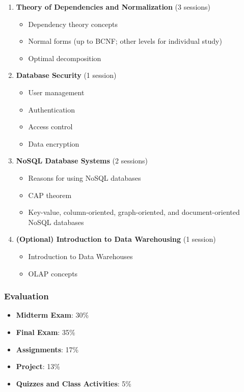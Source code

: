 \documentclass[12pt]{article}
\begin{document}
\begin{enumerate}
    \item \textbf{Theory of Dependencies and Normalization} (3 sessions)
        \begin{itemize}
            \item Dependency theory concepts
            \item Normal forms (up to BCNF; other levels for individual study)
            \item Optimal decomposition
        \end{itemize}

    \item \textbf{Database Security} (1 session)
        \begin{itemize}
            \item User management
            \item Authentication
            \item Access control
            \item Data encryption
        \end{itemize}

    \item \textbf{NoSQL Database Systems} (2 sessions)
        \begin{itemize}
            \item Reasons for using NoSQL databases
            \item CAP theorem
            \item Key-value, column-oriented, graph-oriented, and document-oriented NoSQL databases
        \end{itemize}

    \item \textbf{(Optional) Introduction to Data Warehousing} (1 session)
        \begin{itemize}
            \item Introduction to Data Warehouses
            \item OLAP concepts
        \end{itemize}
\end{enumerate}

\subsubsection*{Evaluation}
\begin{itemize}
    \item \textbf{Midterm Exam}: 30\%
    \item \textbf{Final Exam}: 35\%
    \item \textbf{Assignments}: 17\%
    \item \textbf{Project}: 13\%
    \item \textbf{Quizzes and Class Activities}: 5\%
\end{itemize}
\end{document}
